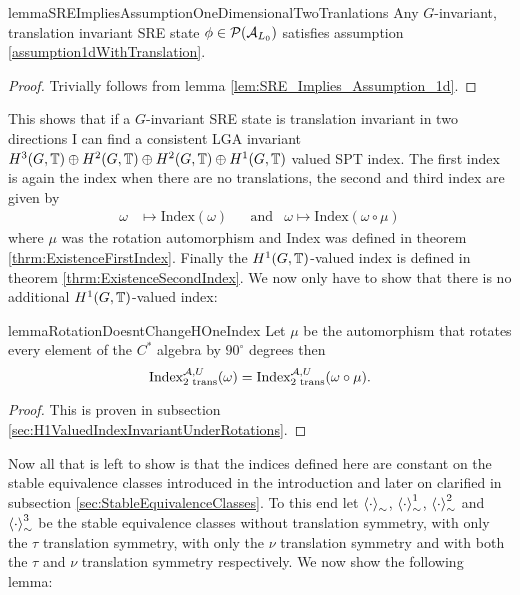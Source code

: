 \documentclass[11pt,a4paper,twoside]{article}
\numberwithin{equation}{section}
\begin{document}
\begin{restatable}{lemma}{SREImpliesAssumptionOneDimensionalTwoTranlations}\label{lem:SRE_Implies_Assumption_1dTwoTranslations}
	Any $G$-invariant, translation invariant SRE state $\phi\in\PP(\AA_{L_0})$ satisfies assumption \ref{assumption1dWithTranslation}.
\end{restatable}
\begin{proof}
	Trivially follows from lemma \ref{lem:SRE_Implies_Assumption_1d}.
\end{proof}
This shows that if a $G$-invariant SRE state is translation invariant in two directions I can find a consistent LGA invariant $H^3(G,\TT)\oplus H^2(G,\TT)\oplus H^2(G,\TT)\oplus H^1(G,\TT)$ valued SPT index. The first index is again the index when there are no translations, the second and third index are given by
\begin{align}
	\omega&\mapsto \textrm{Index}(\omega)&&\text{and}&\omega\mapsto \textrm{Index}(\omega\circ\mu)
\end{align}
where $\mu$ was the rotation automorphism and Index was defined in theorem \ref{thrm:ExistenceFirstIndex}. Finally the $H^1(G,\TT)$-valued index is defined in theorem \ref{thrm:ExistenceSecondIndex}. We now only have to show that there is no additional $H^1(G,\TT)$-valued index:
\begin{restatable}{lemma}{RotationDoesntChangeHOneIndex}\label{lem:RotationDoesn'tChangeH1Index}
	Let $\mu$ be the automorphism that rotates every element of the $C^*$ algebra by $90^\circ$ degrees then
	\begin{equation}
		\textrm{Index}_{\text{2 trans}}^{\AA,U}(\omega)=\textrm{Index}_{\text{2 trans}}^{\AA,U}(\omega\circ\mu).
	\end{equation}
\end{restatable}
\begin{proof}
	This is proven in subsection \ref{sec:H1ValuedIndexInvariantUnderRotations}.
\end{proof}
Now all that is left to show is that the indices defined here are constant on the stable equivalence classes introduced in the introduction and later on clarified in subsection \ref{sec:StableEquivalenceClasses}. To this end let $\expval{\cdot}_\sim$, $\expval{\cdot}_\sim^1$, $\expval{\cdot}_\sim^2$ and $\expval{\cdot}_\sim^3$ be the stable equivalence classes without translation symmetry, with only the $\tau$ translation symmetry, with only the $\nu$ translation symmetry and with both the $\tau$ and $\nu$ translation symmetry respectively. We now show the following lemma:
\end{document}
